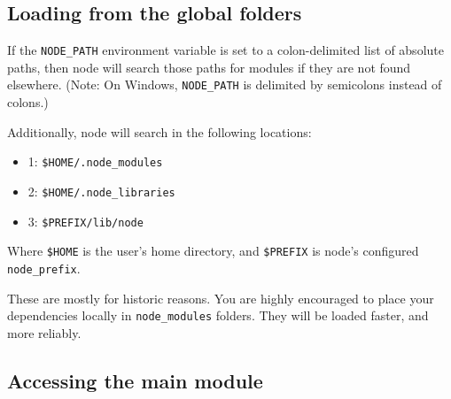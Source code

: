 \begin{Shaded}
\begin{Highlighting}[]
  
 
     
   \NormalTok{. DIR = path join(PARTS[} \NormalTok{.. I] + }\NormalTok{)}
 
\end{Highlighting}
\end{Shaded}

\subsection{Loading from the global folders}

If the \texttt{NODE\_PATH} environment variable is set to a
colon-delimited list of absolute paths, then node will search those
paths for modules if they are not found elsewhere. (Note: On Windows,
\texttt{NODE\_PATH} is delimited by semicolons instead of colons.)

Additionally, node will search in the following locations:

\begin{itemize}
\item
  1: \texttt{\$HOME/.node\_modules}
\item
  2: \texttt{\$HOME/.node\_libraries}
\item
  3: \texttt{\$PREFIX/lib/node}
\end{itemize}

Where \texttt{\$HOME} is the user's home directory, and
\texttt{\$PREFIX} is node's configured \texttt{node\_prefix}.

These are mostly for historic reasons. You are highly encouraged to
place your dependencies locally in \texttt{node\_modules} folders. They
will be loaded faster, and more reliably.

\subsection{Accessing the main module}

